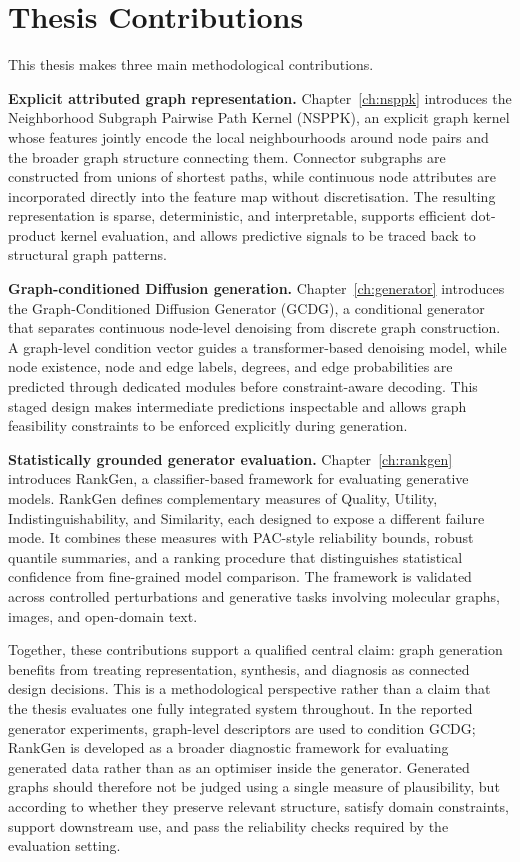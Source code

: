 \section{Thesis Contributions}
\label{sec:intro:contributions}

This thesis makes three main methodological contributions.

\textbf{Explicit attributed graph representation.}
Chapter~\ref{ch:nsppk} introduces the Neighborhood Subgraph Pairwise Path
Kernel (NSPPK), an explicit graph kernel whose features jointly encode the
local neighbourhoods around node pairs and the broader graph structure
connecting them. Connector subgraphs are constructed from unions of shortest
paths, while continuous node attributes are incorporated directly into the
feature map without discretisation. The resulting representation is sparse,
deterministic, and interpretable, supports efficient dot-product kernel
evaluation, and allows predictive signals to be traced back to structural
graph patterns.

\textbf{Graph-conditioned Diffusion generation.}
Chapter~\ref{ch:generator} introduces the Graph-Conditioned Diffusion Generator
(GCDG), a conditional generator that separates continuous node-level denoising
from discrete graph construction. A graph-level condition vector guides a
transformer-based denoising model, while node existence, node and edge labels,
degrees, and edge probabilities are predicted through dedicated modules before
constraint-aware decoding. This staged design makes intermediate predictions
inspectable and allows graph feasibility constraints to be enforced explicitly
during generation.

\textbf{Statistically grounded generator evaluation.}
Chapter~\ref{ch:rankgen} introduces RankGen, a classifier-based framework for
evaluating generative models. RankGen defines complementary measures of
Quality, Utility, Indistinguishability, and Similarity, each designed to expose
a different failure mode. It combines these measures with PAC-style reliability
bounds, robust quantile summaries, and a ranking procedure that distinguishes
statistical confidence from fine-grained model comparison. The framework is
validated across controlled perturbations and generative tasks involving
molecular graphs, images, and open-domain text.

Together, these contributions support a qualified central claim: graph
generation benefits from treating representation, synthesis, and diagnosis as
connected design decisions. This is a methodological perspective rather than a
claim that the thesis evaluates one fully integrated system throughout. In the
reported generator experiments, graph-level descriptors are used to condition
GCDG; RankGen is developed as a broader diagnostic framework for evaluating
generated data rather than as an optimiser inside the generator. Generated
graphs should therefore not be judged using a single measure of plausibility,
but according to whether they preserve relevant structure, satisfy domain
constraints, support downstream use, and pass the reliability checks required
by the evaluation setting.

